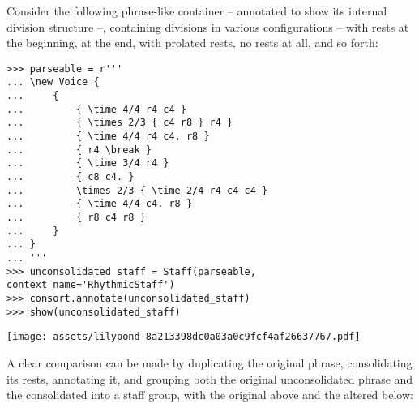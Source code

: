 Consider the following phrase-like container -- annotated to show its internal
division structure --, containing divisions in various configurations --
with rests at the beginning, at the end, with prolated rests, no rests at all,
and so forth:

\begin{comment}
<abjad>
parseable = r'''
\new Voice {
    {
        { \time 4/4 r4 c4 }
        { \times 2/3 { c4 r8 } r4 }
        { \time 4/4 r4 c4. r8 }
        { r4 \break }
        { \time 3/4 r4 }
        { c8 c4. }
        \times 2/3 { \time 2/4 r4 c4 c4 }
        { \time 4/4 c4. r8 }
        { r8 c4 r8 }
    }
}
'''
unconsolidated_staff = Staff(parseable, context_name='RhythmicStaff')
consort.annotate(unconsolidated_staff)
show(unconsolidated_staff)
</abjad>
\end{comment}

\begin{abjadbookoutput}
\begin{singlespacing}
\vspace{-0.5\baselineskip}
\begin{lstlisting}
>>> parseable = r'''
... \new Voice {
...     {
...         { \time 4/4 r4 c4 }
...         { \times 2/3 { c4 r8 } r4 }
...         { \time 4/4 r4 c4. r8 }
...         { r4 \break }
...         { \time 3/4 r4 }
...         { c8 c4. }
...         \times 2/3 { \time 2/4 r4 c4 c4 }
...         { \time 4/4 c4. r8 }
...         { r8 c4 r8 }
...     }
... }
... '''
>>> unconsolidated_staff = Staff(parseable, context_name='RhythmicStaff')
>>> consort.annotate(unconsolidated_staff)
>>> show(unconsolidated_staff)
\end{lstlisting}
\noindent\texttt{[image: assets/lilypond-8a213398dc0a03a0c9fcf4af26637767.pdf]}
\end{singlespacing}
\end{abjadbookoutput}

\noindent A clear comparison can be made by duplicating the original phrase,
consolidating its rests, annotating it, and grouping both the original
unconsolidated phrase and the consolidated into a staff group, with the
original above and the altered below:

\begin{comment}
<abjad>
consolidated_staff = Staff(parseable, context_name='RhythmicStaff')
for voice in consolidated_staff:
    for phrase in voice:
        phrase = consort.SegmentMaker.consolidate_rests(phrase)

consort.annotate(consolidated_staff)
staff_group = StaffGroup([unconsolidated_staff, consolidated_staff])
show(staff_group)
</abjad>
\end{comment}

